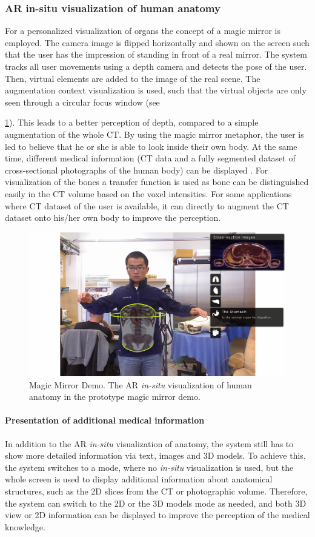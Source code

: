 {\subsubsection{AR in-situ visualization of human anatomy}
For a personalized visualization of organs the concept of a magic mirror is employed. The camera image is flipped horizontally and shown on the screen such that the user has the impression of standing in front of a real mirror. The system tracks all user movements using a depth camera and detects the pose of the user. Then, virtual elements are added to the image of the real scene. The augmentation context visualization \cite{Bichlmeier2007} is used, such that the virtual objects are only seen through a circular focus window (see \figurename{\ref{fig:3-MMC:Mirracle}). This leads to a better perception of depth, compared to a simple augmentation of the whole CT. 
By using the magic mirror metaphor, the user is led to believe that he or she is able to look inside their own body. At the same time, different medical information (CT data and a fully segmented dataset of cross-sectional photographs of the human body) can be displayed \cite{Blum2012}. For visualization of the bones a transfer function is used as bone can be distinguished easily in the CT volume based on the voxel intensities. For some applications where CT dataset of the user is available, it can directly to augment the CT dataset onto his/her own body to improve the perception.
\begin{figure}
	\centering
	\includegraphics[width=0.7\linewidth]{figures/3-MMC/Mirracle}
	\caption{Magic Mirror Demo. The AR \textit{in-situ} visualization of human anatomy in the prototype magic mirror demo.}
	\label{fig:3-MMC:Mirracle}
\end{figure}

\paragraph{Presentation of additional medical information}
In addition to the AR \textit{in-situ} visualization of anatomy, the system still has to show more detailed information via text, images and 3D models. To achieve this, the system switches to a mode, where no \textit{in-situ} visualization is used, but the whole screen is used to display additional information about anatomical structures, such as the 2D slices from the CT or photographic volume.
Therefore, the system can switch to the 2D or the 3D models mode as needed, and both 3D view or 2D information can be displayed to improve the perception of the medical knowledge.

}}
